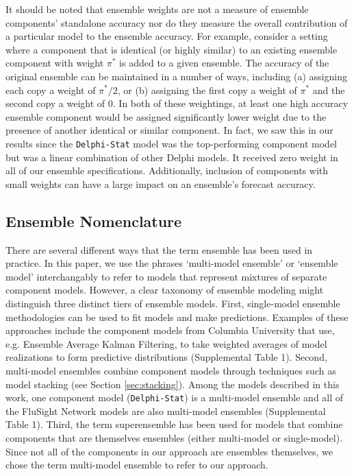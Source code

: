 \documentclass{article}\usepackage[]{graphicx}\usepackage[]{color}
\begin{document}
It should be noted that ensemble weights are not a measure of ensemble components' standalone accuracy nor do they measure the overall contribution of a particular model to the ensemble accuracy.
For example, consider a setting where a component that is identical (or highly similar) to an existing ensemble component with weight $\pi^*$ is added to a given ensemble. 
The accuracy of the original ensemble can be maintained in a number of ways, including (a) assigning each copy a weight of $\pi^*/2$, or (b) assigning the first copy a weight of $\pi^*$ and the second copy a weight of $0$. 
In both of these weightings, at least one high accuracy ensemble component would be assigned significantly lower weight due to the presence of another identical or similar component.
In fact, we saw this in our results since the {\tt Delphi-Stat} model was the top-performing component model but was a linear combination of other Delphi models.
It received zero weight in all of our ensemble specifications.
Additionally, inclusion of components with small weights can have a large impact on an ensemble's forecast accuracy.


\subsection{Ensemble Nomenclature}

There are several different ways that the term ensemble has been used in practice. 
In this paper, we use the phrases `multi-model ensemble' or `ensemble model' interchangably to refer to models that represent mixtures of separate component models. 
However, a clear taxonomy of ensemble modeling might distinguish three distinct tiers of ensemble models. 
First, single-model ensemble methodologies can be used to fit models and make predictions. 
Examples of these approaches include the component models from Columbia University that use, e.g. Ensemble Average Kalman Filtering, to take weighted averages of model realizations to form predictive distributions (Supplemental Table 1).
Second, multi-model ensembles combine component models through techniques such as model stacking (see Section \ref{sec:stacking}).
Among the models described in this work, one component model ({\tt Delphi-Stat}) is a multi-model ensemble and all of the FluSight Network models are also multi-model ensembles (Supplemental Table 1).
Third, the term superensemble has been used for models that combine components that are themselves ensembles (either multi-model or single-model)\cite{krishnamurti1999improved,Yamana2016}.
Since not all of the components in our approach are ensembles themselves, we chose the term multi-model ensemble to refer to our approach.
\end{document}
